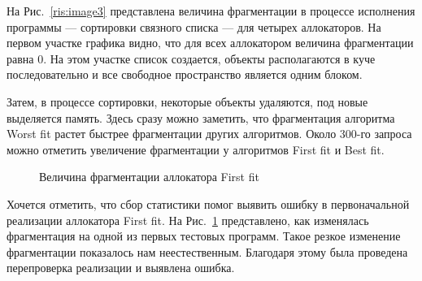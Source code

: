    На Рис.~\ref{ris:image3} представлена величина фрагментации в процессе исполнения программы --- сортировки связного списка --- 
для четырех аллокаторов. На первом участке графика видно, что для всех аллокатором величина фрагментации равна 0. На этом участке 
список создается, объекты располагаются в куче последовательно и все свободное пространство является одним блоком. 
   
   Затем, в процессе сортировки, некоторые объекты удаляются, под новые выделяется память. Здесь сразу можно заметить, 
что фрагментация алгоритма Worst fit растет быстрее фрагментации других алгоритмов. Около 300-го запроса можно отметить 
увеличение фрагментации у алгоритмов First fit и Best fit. 
   
   \begin{figure}[p]
   \caption{Величина фрагментации аллокатора First fit}
   \label{ris:image4}
   \end{figure}
   
    Хочется отметить, что сбор статистики помог выявить ошибку в первоначальной реализации аллокатора First fit. На Рис.~\ref{ris:image4} 
представлено, как изменялась фрагментация на одной из первых тестовых программ. Такое резкое изменение фрагментации показалось нам 
неестественным. Благодаря этому была проведена перепроверка реализации и выявлена ошибка.
   

